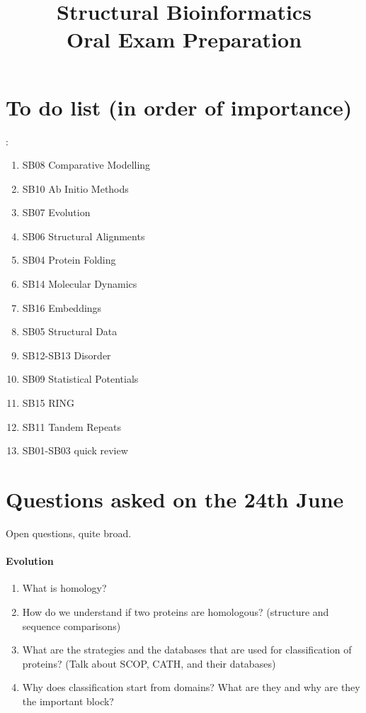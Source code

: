 \documentclass[11pt,a4paper]{article}
\title{Structural Bioinformatics\\Oral Exam Preparation}
\author{}
\date{}
\newcommand{\done}{{\color{Green}\Large\checkmark}}
\begin{document}
\maketitle
\tableofcontents
\newpage

\section*{To do list (in order of importance)}:
\begin{enumerate}
\item SB08 Comparative Modelling \done
\item SB10 Ab Initio Methods \done
\item SB07 Evolution \done
\item SB06 Structural Alignments
\item SB04 Protein Folding \done
\item SB14 Molecular Dynamics
\item SB16 Embeddings
\item SB05 Structural Data \done
\item SB12-SB13 Disorder
\item SB09 Statistical Potentials
\item SB15 RING
\item SB11 Tandem Repeats
\item SB01-SB03 quick review
\end{enumerate}



\section*{Questions asked on the 24th June}
Open questions, quite broad.
\paragraph{Evolution}
\begin{enumerate}
    \item What is homology? 
    \item How do we understand if two proteins are homologous? (structure and sequence comparisons)
    \item What are the strategies and the databases that are used for classification of proteins? (Talk about SCOP, CATH, and their databases)
    \item Why does classification start from domains? What are they and why are they the important block?
\end{enumerate}
\end{document}
